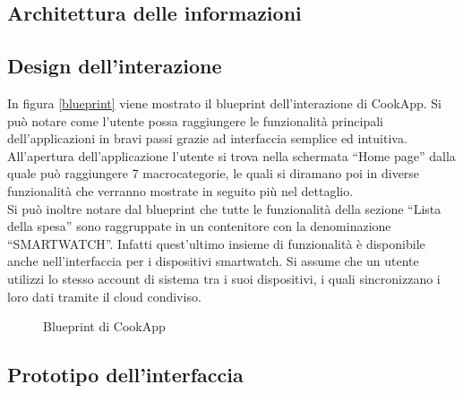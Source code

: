 \subsection{Architettura delle informazioni}

\subsection{Design dell'interazione}

In figura \ref{blueprint} viene mostrato il blueprint dell'interazione
di CookApp. Si può notare come l'utente possa raggiungere le
funzionalità principali dell'applicazioni in bravi passi grazie ad
interfaccia semplice ed intuitiva. All'apertura dell'applicazione
l'utente si trova nella schermata ``Home page'' dalla quale può raggiungere 7
macrocategorie, le quali si diramano poi in diverse funzionalità che verranno
mostrate in seguito più nel dettaglio.\\
Si può inoltre notare dal blueprint che tutte le funzionalità della
sezione ``Lista della spesa''  sono raggruppate in un contenitore con la
denominazione ``SMARTWATCH''. Infatti quest'ultimo insieme di
funzionalità è disponibile anche nell'interfaccia per i dispositivi
smartwatch. Si assume che un utente utilizzi lo stesso account di
sistema tra i suoi dispositivi, i quali sincronizzano i loro dati
tramite il cloud condiviso.


\begin{landscape}
\label{fig:blueprint}
\begin{figure}[!h]
\centering
{}
\caption{Blueprint di CookApp}
\end{figure}
\end{landscape}

\subsection{Prototipo dell'interfaccia}
